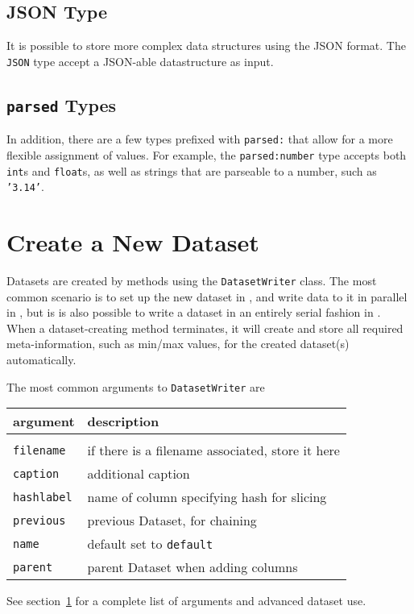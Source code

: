 \subsection{JSON Type}
It is possible to store more complex data structures using the JSON
format.  The \texttt{JSON} type accept a JSON-able datastructure as
input.

\subsection{\texttt{parsed} Types}
In addition, there are a few types prefixed with \texttt{parsed:} that
allow for a more flexible assignment of values.  For example,
the \texttt{parsed:number} type accepts both \texttt{int}s
and \texttt{float}s, as well as strings that are parseable to a
number, such as \texttt{'3.14'}.



\clearpage
\section{Create a New Dataset}
Datasets are created by methods using the \texttt{DatasetWriter}
class.  The most common scenario is to set up the new dataset in
\prepare, and write data to it in parallel in \analysis, but is is
also possible to write a dataset in an entirely serial fashion in
\synthesis.  When a dataset-creating method terminates, it will create
and store all required meta-information, such as min/max values, for
the created dataset(s) automatically.

The most common arguments to \texttt{DatasetWriter} are
\begin{snugshade}
  \begin{tabular}{p{3cm} p{8cm}}
    \\
    \textbf{argument} & \textbf{description}\\[1ex]\hline\\[1ex]
    \texttt{filename}  & if there is a filename associated, store it here\\
    \texttt{caption}   & additional caption\\
    \texttt{hashlabel} & name of column specifying hash for slicing\\
    \texttt{previous}  & previous Dataset, for chaining\\
    \texttt{name}      & default set to \texttt{default}\\
    \texttt{parent}    & parent Dataset when adding columns\\
  \end{tabular}
\end{snugshade}
\noindent See section~\ref{} for a complete list of arguments and
advanced dataset use.




